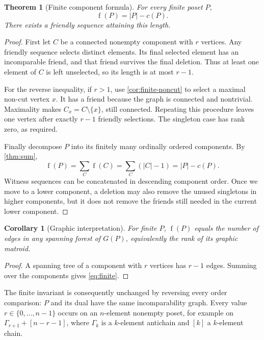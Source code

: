 \documentclass[11pt,a4paper]{article}
\newtheorem{theorem}{Theorem}[section]
\newtheorem{corollary}[corollary]{Corollary}
\theoremstyle{definition}
\theoremstyle{remark}
\DeclareMathOperator{\fot}{f}
\begin{document}
\begin{theorem}[Finite component formula]\label{thm:finite}
For every finite poset $P$,
\begin{equation}\label{eq:finite}
\boxed{\fot(P)=|P|-c(P).}
\end{equation}
There exists a friendly sequence attaining this length.
\end{theorem}
\begin{proof}
First let $C$ be a connected nonempty component with $r$ vertices. Any
friendly sequence selects distinct elements. Its final selected element
has an incomparable friend, and that friend survives the final deletion.
Thus at least one element of $C$ is left unselected, so its length is at
most $r-1$.

For the reverse inequality, if $r>1$, use
\cref{cor:finite-noncut} to select a maximal non-cut vertex $x$. It has a
friend because the graph is connected and nontrivial. Maximality makes
$C_x=C\setminus\{x\}$, still connected. Repeating this procedure leaves one
vertex after exactly $r-1$ friendly selections. The singleton case has rank
zero, as required.

Finally decompose $P$ into its finitely many ordinally ordered components.
By \cref{thm:sum},
\[
\fot(P)=\sum_C\fot(C)=\sum_C(|C|-1)=|P|-c(P).
\]
Witness sequences can be concatenated in descending component order. Once
we move to a lower component, a deletion may also remove the unused
singletons in higher components, but it does not remove the friends still
needed in the current lower component.
\end{proof}

\begin{corollary}[Graphic interpretation]\label{cor:forest}
For finite $P$, $\fot(P)$ equals the number of edges in any spanning forest
of $G(P)$, equivalently the rank of its graphic matroid.
\end{corollary}
\begin{proof}
A spanning tree of a component with $r$ vertices has $r-1$ edges. Summing
over the components gives \eqref{eq:finite}.
\end{proof}

The finite invariant is consequently unchanged by reversing every order
comparison: $P$ and its dual have the same incomparability graph. Every
value $r\in\{0,\ldots,n-1\}$ occurs on an $n$-element nonempty poset, for
example on $\Gamma_{r+1}+[n-r-1]$, where $\Gamma_k$ is a $k$-element
antichain and $[k]$ a $k$-element chain.
\end{document}
